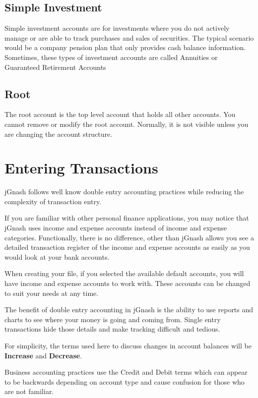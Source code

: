 \documentclass[letterpaper,12pt]{book}
\begin{document}
    \subsection{Simple Investment}
    Simple investment accounts are for investments where you do not actively manage or are able to track purchases and
    sales of securities.
    The typical scenario would be a company pension plan that only provides cash balance information.
    Sometimes, these types of investment accounts are called Annuities or Guaranteed Retirement Accounts

    \subsection{Root}
    The root account is the top level account that holds all other accounts.
    You cannot remove or modify the root account.
    Normally, it is not visible unless you are changing the account structure.

    \section{Entering Transactions}
    jGnash follows well know double entry accounting practices while reducing the complexity of transaction entry.

    If you are familiar with other personal finance applications, you may notice that jGnash uses income
    and expense accounts instead of income and expense categories. Functionally, there is no difference,
    other than jGnash allows you see a detailed transaction register of the income and expense accounts as
    easily as you would look at your bank accounts.

    When creating your file, if you selected the available default accounts, you will have income and expense
    accounts to work with.
    These accounts can be changed to suit your needs at any time.

    The benefit of double entry accounting in jGnash is the ability to use reports and charts to see where your
    money is going and coming from.
    Single entry transactions hide those details and make tracking difficult and tedious.

    \begin{mdframed}[style=info]
        For simplicity, the terms used here to discuss changes in account balances will be \textbf{Increase} and \textbf{Decrease}.

        Business accounting practices use the Credit and Debit terms which can appear to be backwards depending on account type
        and cause confusion for those who are not familiar.
    \end{mdframed}
\end{document}
